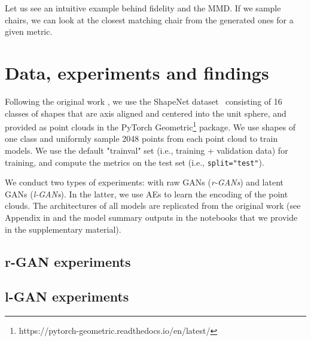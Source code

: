 \documentclass[12pt]{article}
\newcommand{\contentdescription}[1]{}
\begin{document}
    Let us see an intuitive example behind fidelity and the MMD.
    If we sample chairs, we can look at the closest matching chair from the generated ones for a given metric.


    \section{Data, experiments and findings}
    \contentdescription{
        Data, experiments and findings (30-40\%):
        Describe the data you are working with for your project.
        What type of data is it?
        Where did it come from?
        How much data are you working with?
        Did you have to do any preprocessing, filtering, or other special treatment to use this data in your project?
        Describe and present the experiments that you performed and what is the reason for those experiments.
        Where applicable define evaluation metrics that you used. Discuss the results that you got.
    }

    Following the original work \cite{pmlr-v80-achlioptas18a}, we use the ShapeNet dataset~\cite{arxiv:1512.03012} consisting of 16 classes of shapes
    that are axis aligned and centered into the unit sphere, and provided as point clouds in the PyTorch Geometric\footnote{https://pytorch-geometric.readthedocs.io/en/latest/} package.
    We use shapes of one class and uniformly sample 2048 points from each point cloud to train models. We use the default "trainval" set (i.e., training + validation data) for training, and compute the metrics on the test set (i.e., \verb|split="test"|).

    We conduct two types of experiments: with raw GANs (\textit{r-GANs}) and latent GANs (\textit{l-GANs}). In the latter, we use AEs to learn the encoding of the point clouds. The architectures of all models are replicated from the original work (see Appendix in \cite{pmlr-v80-achlioptas18a} and the model summary outputs in the notebooks that we provide in the supplementary material).

    \subsection{r-GAN experiments}

    \subsection{l-GAN experiments}
\end{document}
